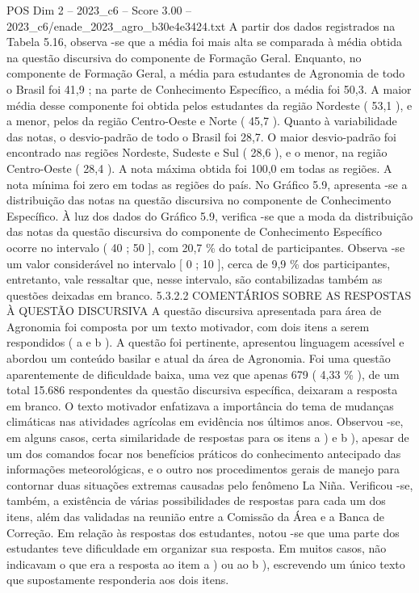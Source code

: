 \begin{textsample}{POS Dim 2 – 2023\_c6 – Score 3.00 – 2023\_c6/enade\_2023\_agro\_b30e4e3424.txt}
A partir dos dados registrados na Tabela 5.16, observa -se que a média foi mais alta se comparada à média obtida na questão discursiva do componente de Formação Geral.
Enquanto, no componente de Formação Geral, a média para estudantes de Agronomia de todo o Brasil foi 41,9 ; na parte de Conhecimento Específico, a média foi 50,3.
A maior média desse componente foi obtida pelos estudantes da região Nordeste ( 53,1 ), e a menor, pelos da região Centro-Oeste e Norte ( 45,7 ).
Quanto à variabilidade das notas, o desvio-padrão de todo o Brasil foi 28,7.
O maior desvio-padrão foi encontrado nas regiões Nordeste, Sudeste e Sul ( 28,6 ), e o menor, na região Centro-Oeste ( 28,4 ).
A nota máxima obtida foi 100,0 em todas as regiões.
A nota mínima foi zero em todas as regiões do país.
No Gráfico 5.9, apresenta -se a distribuição das notas na questão discursiva no componente de Conhecimento Específico.
À luz dos dados do Gráfico 5.9, verifica -se que a moda da distribuição das notas da questão discursiva do componente de Conhecimento Específico ocorre no intervalo ( 40 ; 50 ], com 20,7 \% do total de participantes.
Observa -se um valor considerável no intervalo [ 0 ; 10 ], cerca de 9,9 \% dos participantes, entretanto, vale ressaltar que, nesse intervalo, são contabilizadas também as questões deixadas em branco. 5.3.2.2 COMENTÁRIOS SOBRE AS RESPOSTAS À QUESTÃO DISCURSIVA A questão discursiva apresentada para área de Agronomia foi composta por um texto motivador, com dois itens a serem respondidos ( a e b ).
A questão foi pertinente, apresentou linguagem acessível e abordou um conteúdo basilar e atual da área de Agronomia.
Foi uma questão aparentemente de dificuldade baixa, uma vez que apenas 679 ( 4,33 \% ), de um total 15.686 respondentes da questão discursiva específica, deixaram a resposta em branco.
O texto motivador enfatizava a importância do tema de mudanças climáticas nas atividades agrícolas em evidência nos últimos anos.
Observou -se, em alguns casos, certa similaridade de respostas para os itens a ) e b ), apesar de um dos comandos focar nos benefícios práticos do conhecimento antecipado das informações meteorológicas, e o outro nos procedimentos gerais de manejo para contornar duas situações extremas causadas pelo fenômeno La Niña.
Verificou -se, também, a existência de várias possibilidades de respostas para cada um dos itens, além das validadas na reunião entre a Comissão da Área e a Banca de Correção.
Em relação às respostas dos estudantes, notou -se que uma parte dos estudantes teve dificuldade em organizar sua resposta.
Em muitos casos, não indicavam o que era a resposta ao item a ) ou ao b ), escrevendo um único texto que supostamente responderia aos dois itens.

\end{textsample}
